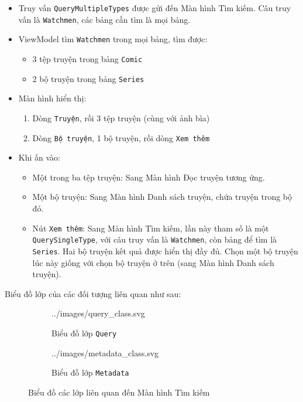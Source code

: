 \documentclass[../../../../thesis]{subfiles}
\begin{document}
\begin{itemize}
    \item
        Truy vấn \texttt{QueryMultipleTypes} được gửi đến Màn hình Tìm kiếm. Câu
        truy vấn là \texttt{Watchmen}, các bảng cần tìm là mọi bảng.
    \item
        ViewModel tìm \texttt{Watchmen} trong mọi bảng, tìm được:

        \begin{itemize}
            \item
              3 tệp truyện trong bảng \texttt{Comic}
            \item
                2 bộ truyện trong bảng \texttt{Series}
        \end{itemize}
    \item
        Màn hình hiển thị:

        \begin{enumerate}
            \item
                Dòng \texttt{Truyện}, rồi 3 tệp truyện (cùng với ảnh bìa)
            \item
                Dòng \texttt{Bộ\ truyện}, 1 bộ truyện, rồi dòng \texttt{Xem\
                thêm}
        \end{enumerate}
    \item
        Khi ấn vào:

        \begin{itemize}
            \item
                Một trong ba tệp truyện: Sang Màn hình Đọc truyện tương ứng.
            \item
                Một bộ truyện: Sang Màn hình Danh sách truyện, chứa truyện trong
                bộ đó.
            \item
                Nút \texttt{Xem\ thêm}: Sang Màn hình Tìm kiếm, lần này tham số
                là một \texttt{QuerySingleType}, với câu truy vấn là
                \texttt{Watchmen}, còn bảng để tìm là \texttt{Series}. Hai bộ
                truyện kết quả được hiển thị đầy đủ. Chọn một bộ truyện lúc này
                giống với chọn bộ truyện ở trên (sang Màn hình Danh sách
                truyện).
        \end{itemize}
\end{itemize}

Biểu đồ lớp của các đối tượng liên quan như sau:

\begin{figure}[H]
    \centering
    \begin{subfigure}[b]{0.36\textwidth}
        \centering
        
            {../images/query_class.svg}
        \caption{Biểu đồ lớp \texttt{Query}}
    \end{subfigure}
    \begin{subfigure}[b]{0.63\textwidth}
        \centering
        
            {../images/metadata_class.svg}
        \caption{Biểu đồ lớp \texttt{Metadata}}
    \end{subfigure}
    \caption{Biểu đồ các lớp liên quan đến Màn hình Tìm kiếm}
    \label{fig:graph-related-class}
\end{figure}
\end{document}
